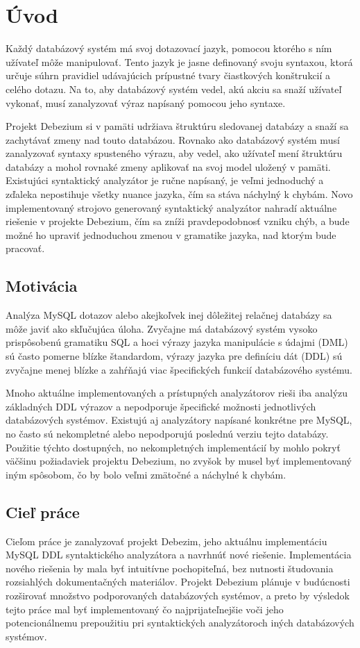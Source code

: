 \chapter{Úvod}
Každý databázový systém má svoj dotazovací jazyk, pomocou ktorého s ním užívateľ môže manipulovať. Tento jazyk je jasne definovaný svoju syntaxou, ktorá určuje súhrn pravidiel udávajúcich prípustné tvary čiastkových konštrukcií a celého dotazu. Na to, aby databázový systém vedel, akú akciu sa snaží užívateľ vykonať, musí zanalyzovať výraz napísaný pomocou jeho syntaxe.

Projekt Debezium si v pamäti udržiava štruktúru sledovanej databázy a snaží sa zachytávať zmeny nad touto databázou. Rovnako ako databázový systém musí zanalyzovať syntaxy spusteného výrazu, aby vedel, ako užívateľ mení štruktúru databázy a mohol rovnaké zmeny aplikovať na svoj model uložený v pamäti.
Existujúci syntaktický analyzátor je ručne napísaný, je veľmi jednoduchý a zďaleka nepostihuje všetky nuance  jazyka, čím sa stáva náchylný k chybám. Novo implementovaný strojovo generovaný syntaktický analyzátor nahradí aktuálne riešenie v projekte Debezium, čím sa zníži pravdepodobnosť vzniku chýb, a bude možné ho upraviť jednoduchou zmenou v gramatike jazyka, nad ktorým bude pracovať.

\section{Motivácia}
Analýza MySQL dotazov alebo akejkoľvek inej dôležitej relačnej databázy sa môže javiť ako skľučujúca úloha. Zvyčajne má databázový systém vysoko prispôsobenú gramatiku SQL a hoci výrazy jazyka manipulácie s údajmi (DML) sú často pomerne blízke štandardom, výrazy jazyka pre definíciu dát (DDL) sú zvyčajne menej blízke a zahŕňajú viac špecifických funkcií databázového systému.

Mnoho aktuálne implementovaných a prístupných analyzátorov rieši iba analýzu základných DDL výrazov a nepodporuje špecifické možnosti jednotlivých databázových systémov. Existujú aj analyzátory napísané konkrétne pre MySQL, no často sú nekompletné alebo nepodporujú poslednú verziu tejto databázy. Použitie týchto dostupných, no nekompletných implementácií by mohlo pokryť väčšinu požiadaviek projektu Debezium, no zvyšok by musel byť implementovaný iným spôsobom, čo by bolo veľmi zmätočné a náchylné k chybám.

\section{Cieľ práce}
Cieľom práce je zanalyzovať projekt Debezim, jeho aktuálnu implementáciu MySQL DDL syntaktického analyzátora a navrhnúť nové riešenie. Implementácia nového riešenia by mala byť intuitívne pochopiteľná, bez nutnosti študovania rozsiahlých dokumentačných materiálov. Projekt Debezium plánuje v budúcnosti rozširovať množstvo podporovaných databázových systémov, a preto by výsledok tejto práce mal byť implementovaný čo najprijateľnejšie voči jeho potencionálnemu prepoužitiu pri syntaktických analyzátoroch iných databázových systémov.